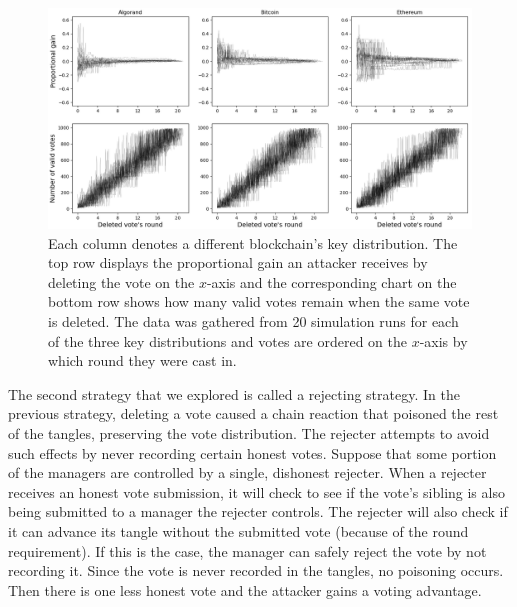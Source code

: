\begin{figure}[h]
	\centering
	\includegraphics[width=\linewidth]{img/deleter}
	\caption{Each column denotes a different blockchain's key distribution. The top row displays the proportional gain an attacker receives by deleting the vote on the $x$-axis and the corresponding chart on the bottom row shows how many valid votes remain when the same vote is deleted. The data was gathered from 20 simulation runs for each of the three key distributions and votes are ordered on the $x$-axis by which round they were cast in.}
	\label{fig:deleter}
\end{figure}

The second strategy that we explored is called a rejecting strategy.
In the previous strategy, deleting a vote caused a chain reaction that poisoned the rest of the tangles, preserving the vote distribution.
The rejecter attempts to avoid such effects by never recording certain honest votes.
Suppose that some portion of the managers are controlled by a single, dishonest rejecter.
When a rejecter receives an honest vote submission, it will check to see if the vote's sibling is also being submitted to a manager the rejecter controls.
The rejecter will also check if it can advance its tangle without the submitted vote (because of the round requirement).
If this is the case, the manager can safely reject the vote by not recording it.
Since the vote is never recorded in the tangles, no poisoning occurs.
Then there is one less honest vote and the attacker gains a voting advantage.

